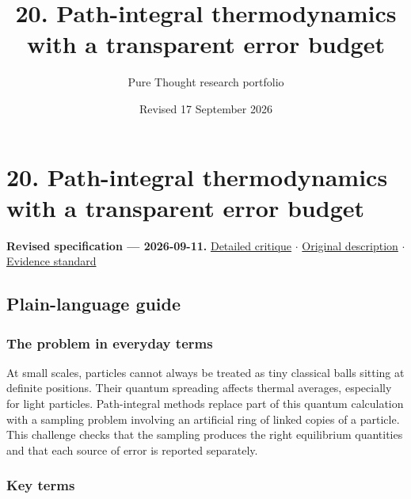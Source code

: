 \documentclass[
  11pt,
]{article}
\title{20. Path-integral thermodynamics with a transparent error budget}
\author{Pure Thought research portfolio}
\date{Revised 17 September 2026}
\begin{document}
\maketitle
\thispagestyle{empty}
\clearpage

\section{20. Path-integral thermodynamics with a transparent error
budget}

\textbf{Revised specification --- 2026-09-11.}
\href{https://github.com/rick-stevens-ai/Pure-Thought/blob/main/reviews/20-Ab-Initio-Path-Integrals.md}{Detailed
critique} \ensuremath{\cdot}
\href{https://github.com/rick-stevens-ai/Pure-Thought/blob/main/archive/original-PRDs/20-Ab-Initio-Path-Integrals.md}{Original
description} \ensuremath{\cdot}
\href{https://github.com/rick-stevens-ai/Pure-Thought/blob/main/reviews/EVIDENCE-STANDARD.md}{Evidence
standard}

\subsection{Plain-language guide}

\subsubsection{The problem in everyday terms}

At small scales, particles cannot always be treated as tiny classical
balls sitting at definite positions. Their quantum spreading affects
thermal averages, especially for light particles. Path-integral methods
replace part of this quantum calculation with a sampling problem
involving an artificial ring of linked copies of a particle. This
challenge checks that the sampling produces the right equilibrium
quantities and that each source of error is reported separately.

\subsubsection{Key terms}
\end{document}
